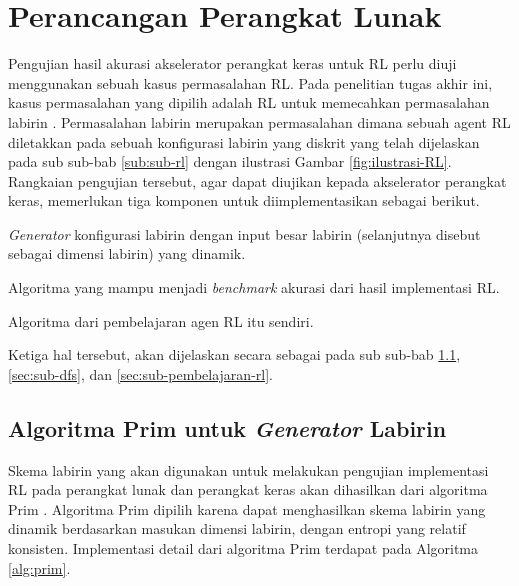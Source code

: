 \section{Perancangan Perangkat Lunak}
\label{sec:perancangan-perangkat-lunak}

Pengujian hasil akurasi akselerator perangkat keras untuk \ac{RL} perlu diuji menggunakan sebuah kasus permasalahan \ac{RL}. Pada penelitian tugas akhir ini, kasus permasalahan yang dipilih adalah \ac{RL} untuk memecahkan permasalahan labirin \parencite{mini2023understanding}. Permasalahan labirin merupakan permasalahan dimana sebuah agent \ac{RL} diletakkan pada sebuah konfigurasi labirin yang diskrit yang telah dijelaskan pada sub sub-bab \ref{sub:sub-rl} dengan ilustrasi Gambar \ref{fig:ilustrasi-RL}. Rangkaian pengujian tersebut, agar dapat diujikan kepada akselerator perangkat keras, memerlukan tiga komponen untuk diimplementasikan sebagai berikut.

\vspace{-5mm}
\begin{enumerate}
\end{enumerate}

Ketiga hal tersebut, akan dijelaskan secara sebagai pada sub sub-bab \ref{sec:sub-prim}, \ref{sec:sub-dfs}, dan \ref{sec:sub-pembelajaran-rl}.

\subsection{Algoritma Prim untuk \textit{Generator} Labirin}
\label{sec:sub-prim}

Skema labirin yang akan digunakan untuk melakukan pengujian implementasi \ac{RL} pada perangkat lunak dan perangkat keras akan dihasilkan dari algoritma Prim \parencite{devian2013implementasi}. Algoritma Prim dipilih karena dapat menghasilkan skema labirin yang dinamik berdasarkan masukan dimensi labirin, dengan entropi yang relatif konsisten. Implementasi detail dari algoritma Prim terdapat pada Algoritma \ref{alg:prim}.

